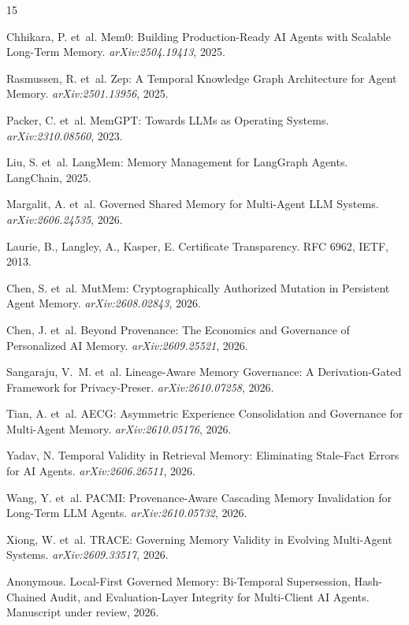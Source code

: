 \documentclass{article}
\begin{document}
\begin{thebibliography}{15}

Chhikara, P. et~al.
\newblock Mem0: Building Production-Ready AI Agents with Scalable Long-Term Memory.
\newblock \emph{arXiv:2504.19413}, 2025.

Rasmussen, R. et~al.
\newblock Zep: A Temporal Knowledge Graph Architecture for Agent Memory.
\newblock \emph{arXiv:2501.13956}, 2025.

Packer, C. et~al.
\newblock MemGPT: Towards LLMs as Operating Systems.
\newblock \emph{arXiv:2310.08560}, 2023.

Liu, S. et~al.
\newblock LangMem: Memory Management for LangGraph Agents.
\newblock LangChain, 2025.

Margalit, A. et~al.
\newblock Governed Shared Memory for Multi-Agent LLM Systems. \newblock \emph{arXiv:2606.24535}, 2026.

Laurie, B., Langley, A., Kasper, E.
\newblock Certificate Transparency.
\newblock RFC 6962, IETF, 2013.

Chen, S. et~al.
\newblock MutMem: Cryptographically Authorized Mutation in Persistent Agent Memory. \newblock \emph{arXiv:2608.02843}, 2026.

Chen, J. et~al.
\newblock Beyond Provenance: The Economics and Governance of Personalized AI Memory. \newblock \emph{arXiv:2609.25521}, 2026.

Sangaraju, V.~M. et~al.
\newblock Lineage-Aware Memory Governance: A Derivation-Gated Framework for Privacy-Preser. \newblock \emph{arXiv:2610.07258}, 2026.

Tian, A. et~al.
\newblock AECG: Asymmetric Experience Consolidation and Governance for Multi-Agent Memory.
\newblock \emph{arXiv:2610.05176}, 2026.

Yadav, N.
\newblock Temporal Validity in Retrieval Memory: Eliminating Stale-Fact Errors for AI Agents.
\newblock \emph{arXiv:2606.26511}, 2026.


Wang, Y. et~al.
\newblock PACMI: Provenance-Aware Cascading Memory Invalidation for Long-Term LLM Agents.
\newblock \emph{arXiv:2610.05732}, 2026.

Xiong, W. et~al.
\newblock TRACE: Governing Memory Validity in Evolving Multi-Agent Systems.
\newblock \emph{arXiv:2609.33517}, 2026.

Anonymous.
\newblock Local-First Governed Memory: Bi-Temporal Supersession, Hash-Chained Audit, and Evaluation-Layer Integrity for Multi-Client AI Agents.
\newblock Manuscript under review, 2026.
\end{thebibliography}
\end{document}
